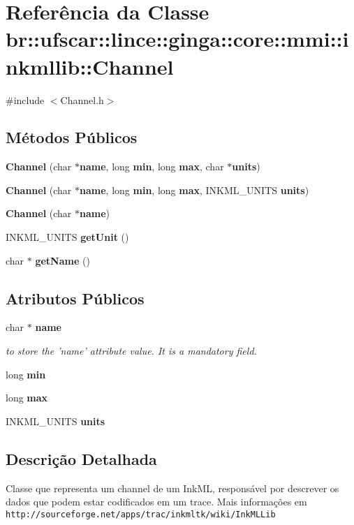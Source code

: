 \section{Referência da Classe br::ufscar::lince::ginga::core::mmi::inkmllib::Channel}
\label{classbr_1_1ufscar_1_1lince_1_1ginga_1_1core_1_1mmi_1_1inkmllib_1_1Channel}


{\ttfamily \#include $<$Channel.h$>$}

\subsection*{Métodos Públicos}
\begin{DoxyCompactItemize}
\item 
{\bf Channel} (char $\ast${\bf name}, long {\bf min}, long {\bf max}, char $\ast${\bf units})
\item 
{\bf Channel} (char $\ast${\bf name}, long {\bf min}, long {\bf max}, INKML\_\-UNITS {\bf units})
\item 
{\bf Channel} (char $\ast${\bf name})
\item 
INKML\_\-UNITS {\bf getUnit} ()
\item 
char $\ast$ {\bf getName} ()
\end{DoxyCompactItemize}
\subsection*{Atributos Públicos}
\begin{DoxyCompactItemize}
\item 
char $\ast$ {\bf name}\label{classbr_1_1ufscar_1_1lince_1_1ginga_1_1core_1_1mmi_1_1inkmllib_1_1Channel_ac3fd31c3bc013d532a0203f5c7dd03c2}

\begin{DoxyCompactList}\small\item\em to store the 'name' attribute value. It is a mandatory field. \item\end{DoxyCompactList}\item 
long {\bf min}
\item 
long {\bf max}
\item 
INKML\_\-UNITS {\bf units}
\end{DoxyCompactItemize}


\subsection{Descrição Detalhada}
Classe que representa um channel de um InkML, responsável por descrever os dados que podem estar codificados em um trace. Mais informações em {\tt http://sourceforge.net/apps/trac/inkmltk/wiki/InkMLLib} 

